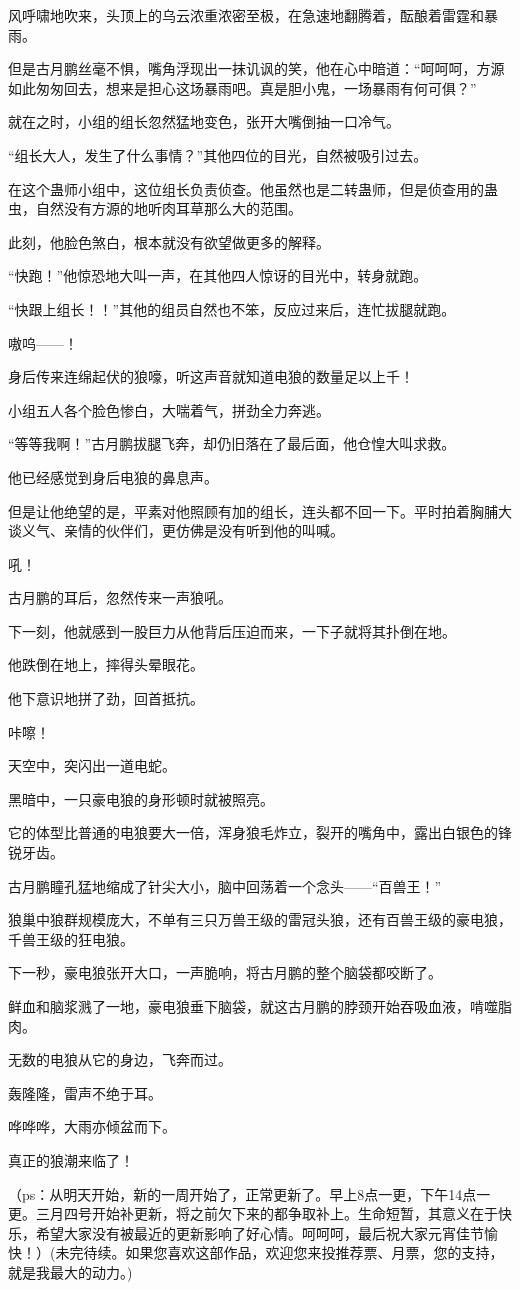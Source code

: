 \begin{this_body}
风呼啸地吹来，头顶上的乌云浓重浓密至极，在急速地翻腾着，酝酿着雷霆和暴雨。

但是古月鹏丝毫不惧，嘴角浮现出一抹讥讽的笑，他在心中暗道：“呵呵呵，方源如此匆匆回去，想来是担心这场暴雨吧。真是胆小鬼，一场暴雨有何可俱？”

就在之时，小组的组长忽然猛地变色，张开大嘴倒抽一口冷气。

“组长大人，发生了什么事情？”其他四位的目光，自然被吸引过去。

在这个蛊师小组中，这位组长负责侦查。他虽然也是二转蛊师，但是侦查用的蛊虫，自然没有方源的地听肉耳草那么大的范围。

此刻，他脸色煞白，根本就没有欲望做更多的解释。

“快跑！”他惊恐地大叫一声，在其他四人惊讶的目光中，转身就跑。

“快跟上组长！！”其他的组员自然也不笨，反应过来后，连忙拔腿就跑。

嗷呜——！

身后传来连绵起伏的狼嚎，听这声音就知道电狼的数量足以上千！

小组五人各个脸色惨白，大喘着气，拼劲全力奔逃。

“等等我啊！”古月鹏拔腿飞奔，却仍旧落在了最后面，他仓惶大叫求救。

他已经感觉到身后电狼的鼻息声。

但是让他绝望的是，平素对他照顾有加的组长，连头都不回一下。平时拍着胸脯大谈义气、亲情的伙伴们，更仿佛是没有听到他的叫喊。

吼！

古月鹏的耳后，忽然传来一声狼吼。

下一刻，他就感到一股巨力从他背后压迫而来，一下子就将其扑倒在地。

他跌倒在地上，摔得头晕眼花。

他下意识地拼了劲，回首抵抗。

咔嚓！

天空中，突闪出一道电蛇。

黑暗中，一只豪电狼的身形顿时就被照亮。

它的体型比普通的电狼要大一倍，浑身狼毛炸立，裂开的嘴角中，露出白银色的锋锐牙齿。

古月鹏瞳孔猛地缩成了针尖大小，脑中回荡着一个念头——“百兽王！”

狼巢中狼群规模庞大，不单有三只万兽王级的雷冠头狼，还有百兽王级的豪电狼，千兽王级的狂电狼。

下一秒，豪电狼张开大口，一声脆响，将古月鹏的整个脑袋都咬断了。

鲜血和脑浆溅了一地，豪电狼垂下脑袋，就这古月鹏的脖颈开始吞吸血液，啃噬脂肉。

无数的电狼从它的身边，飞奔而过。

轰隆隆，雷声不绝于耳。

哗哗哗，大雨亦倾盆而下。

真正的狼潮来临了！

（ps：从明天开始，新的一周开始了，正常更新了。早上8点一更，下午14点一更。三月四号开始补更新，将之前欠下来的都争取补上。生命短暂，其意义在于快乐，希望大家没有被最近的更新影响了好心情。呵呵呵，最后祝大家元宵佳节愉快！）(未完待续。如果您喜欢这部作品，欢迎您来投推荐票、月票，您的支持，就是我最大的动力。)

\end{this_body}

